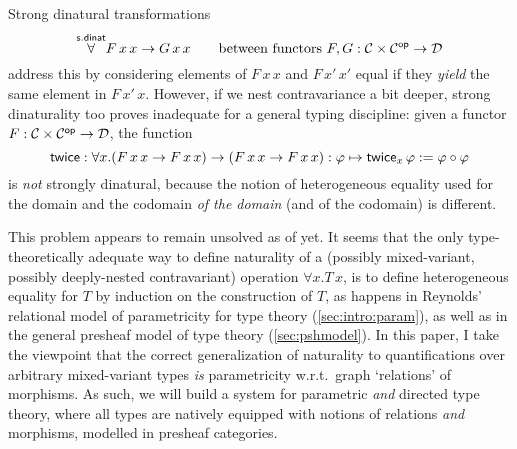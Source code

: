 \documentclass[twoLevelNum]{higherStructures} %
\begin{document}
Strong dinatural transformations
\[
	\overset{\mathsf{s.dinat}}{\forall} F\,x\,x \to G\,x\,x \qquad \text{between functors $F, G : {\mathcal{C}} \times {\mathcal{C}}^{\mathsf{op}} \to {\mathcal{D}}$}
\]
address this by considering elements of $F\,x\,x$ and $F\,x'\,x'$ equal if they \emph{yield} the same element in $F\,x'\,x$.
However, if we nest contravariance a bit deeper, strong dinaturality too proves inadequate for a general typing discipline: given a functor $F : {\mathcal{C}} \times {\mathcal{C}}^{\mathsf{op}} \to {\mathcal{D}}$, the function
\[
	\mathsf{twice} : \forall x . (F\,x\,x \to F\,x\,x) \to (F\,x\,x \to F\,x\,x) : \varphi \mapsto \mathsf{twice}_x\,\varphi := \varphi \circ \varphi
\]
is \emph{not} strongly dinatural, because the notion of heterogeneous equality used for the domain and the codomain \emph{of the domain} (and of the codomain) is different.


This problem appears to remain unsolved as of yet.
It seems that the only type-theoretically adequate way to define naturality of a (possibly mixed-variant, possibly deeply-nested contravariant) operation $\forall x.T\,x$, is to define heterogeneous equality for $T$ by induction on the construction of $T$, as happens in Reynolds' relational model of parametricity for type theory \cite{reynolds} (\cref{sec:intro:param}), as well as in the general presheaf model of type theory \cite[ch.\ 4]{Hofmann97} (\cref{sec:pshmodel}).
In this paper, I take the viewpoint that the correct generalization of naturality to quantifications over arbitrary mixed-variant types \emph{is} parametricity w.r.t.\ graph `relations' of morphisms.
As such, we will build a system for parametric \emph{and} directed type theory, where all types are natively equipped with notions of relations \emph{and} morphisms, modelled in presheaf categories.
\end{document}
